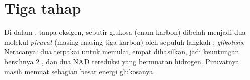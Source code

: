 \section{Tiga tahap}

\begin{proposition}[Glikolisis]\label{prop:g12:respiration-fermentation:glycolysis}
Di dalam , tanpa oksigen, sebutir glukosa (enam karbon)
dibelah menjadi dua molekul \emph{piruvat} (masing-masing tiga karbon)
oleh sepuluh langkah : \emph{glikolisis}.
Neracanya: dua  terpakai untuk memulai, empat dihasilkan, jadi
keuntungan bersihnya 2 , dan dua NAD tereduksi yang bermuatan
hidrogen. Piruvatnya masih memuat sebagian besar energi glukosanya.
\end{proposition}
\admitted

